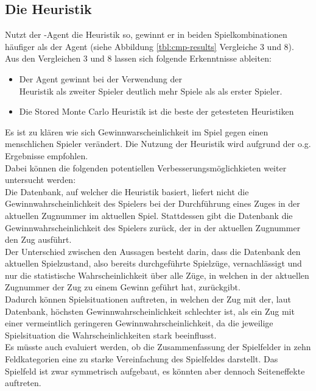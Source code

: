 \subsection{Die Heuristik }
\label{fz:h_smc}
Nutzt der \mxZitat{\abp}-Agent die  Heuristik so, gewinnt er in beiden Spielkombinationen häufiger als der  Agent (siehe Abbildung \ref{tbl:cmp-results} Vergleiche 3 und 8).
\\Aus den Vergleichen 3 und 8 lassen sich folgende Erkenntnisse ableiten:
\begin{itemize}
\item Der Agent \mxZitat{\abp} gewinnt bei der Verwendung der \\ Heuristik als zweiter Spieler deutlich mehr Spiele als als erster Spieler.
\item Die Stored Monte Carlo Heuristik ist die beste der getesteten Heuristiken
\end{itemize}
Es ist zu klären wie sich Gewinnwarscheinlichkeit im Spiel gegen einen menschlichen Spieler verändert.
Die Nutzung der Heuristik  wird aufgrund der o.g. Ergebnisse empfohlen.
\\Dabei können die folgenden potentiellen Verbesserungsmöglichkieten weiter untersucht werden:
\vspace{0.5cm}
\\Die Datenbank, auf welcher die Heuristik basiert, liefert nicht die Gewinnwahrscheinlichkeit des Spielers bei der Durchführung eines Zuges in der aktuellen Zugnummer im aktuellen Spiel. Stattdessen gibt die Datenbank die Gewinnwahrscheinlichkeit des Spielers zurück, der in der aktuellen Zugnummer den Zug ausführt.
\\Der Unterschied zwischen den Aussagen besteht darin, dass die Datenbank den aktuellen Spielzustand, also bereits durchgeführte Spielzüge, vernachlässigt und nur die statistische Wahrscheinlichkeit über alle Züge, in welchen in der aktuellen Zugnummer der Zug zu einem Gewinn geführt hat, zurückgibt.
\\Dadurch können Spielsituationen auftreten, in welchen der Zug mit der, laut Datenbank, höchsten Gewinnwahrscheinlichkeit schlechter ist, als ein Zug mit einer vermeintlich geringeren Gewinnwahrscheinlichkeit, da die jeweilige Spielsituation die Wahrscheinlichkeiten stark beeinflusst.
\vspace{0.5cm}
\\Es müsste auch evaluiert werden, ob die Zusammenfassung der Spielfelder in zehn Feldkategorien eine zu starke Vereinfachung des Spielfeldes darstellt. Das Spielfeld ist zwar symmetrisch aufgebaut, es könnten aber dennoch Seiteneffekte auftreten.
